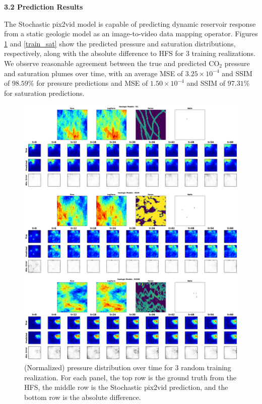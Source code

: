 \documentclass[10pt, twoside]{article}
\begin{document}
\textbf{3.2 Prediction Results}

The Stochastic pix2vid model is capable of predicting dynamic reservoir response from a static geologic model as an image-to-video data mapping operator. Figures \ref{train_pres} and \ref{train_sat} show the predicted pressure and saturation distributions, respectively, along with the absolute difference to HFS for 3 training realizations. We observe reasonable agreement between the true and predicted CO$_2$ pressure and saturation plumes over time, with an average MSE of $3.25\times10^{-4}$ and SSIM of $98.59\%$ for pressure predictions and MSE of $1.50\times10^{-4}$ and SSIM of $97.31\%$ for saturation predictions.

\begin{figure}
    \centering
    \includegraphics[width=16cm]{figures/train_pres.png}
    \caption{(Normalized) pressure distribution over time for 3 random training realization. For each panel, the top row is the ground truth from the HFS, the middle row is the Stochastic pix2vid prediction, and the bottom row is the absolute difference.}
    \label{train_pres}
\end{figure}
\end{document}
